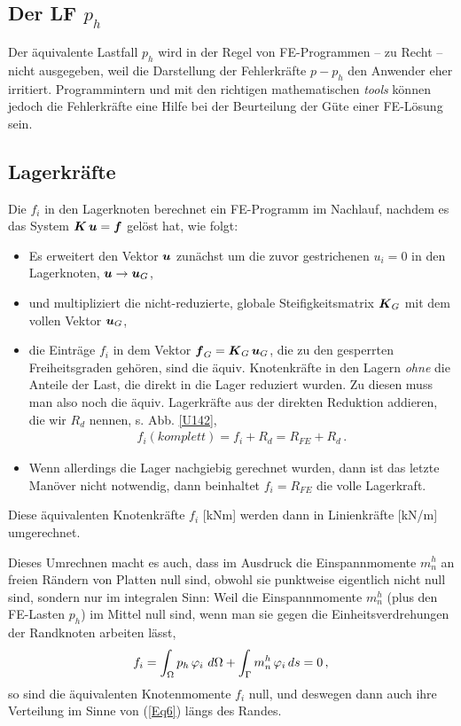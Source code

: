 {\textcolor{sectionTitleBlue}{\subsection{Der LF $p_h$}}}
 Der \"{a}quivalente Lastfall $p_h$ wird in der Regel von FE-Program\-men -- zu Recht -- nicht ausgegeben, weil die Darstellung der Fehlerkr\"{a}fte $p - p_h$ den Anwender eher irritiert. Programmintern und mit den richtigen mathematischen {\em tools\/} k\"{o}nnen jedoch die Fehlerkr\"{a}fte eine Hilfe bei der Beurteilung der G\"{u}te einer FE-L\"{o}sung sein.
\pagebreak
{\textcolor{sectionTitleBlue}{\subsection{Lagerkr\"{a}fte}}}
Die $f_i$ in den Lagerknoten berechnet ein FE-Programm im Nachlauf, nachdem es das System $\mbox{\boldmath $K$}\,\mbox{\boldmath $u$} = \mbox{\boldmath $f$}$ gel\"{o}st hat, wie folgt: \\
\begin{itemize}
  \item Es erweitert den Vektor $\mbox{\boldmath $u$}$ zun\"{a}chst um die zuvor gestrichenen $u_i = 0$ in den Lagerknoten, $\mbox{\boldmath $u$} \to \mbox{\boldmath $u$}_{G}$,
  \item und multipliziert die nicht-reduzierte, globale Steifigkeitsmatrix $\mbox{\boldmath $K$}_{G}$ mit dem vollen Vektor $\mbox{\boldmath $u$}_{G}$,
  \item die Eintr\"{a}ge $f_i$ in dem Vektor $\mbox{\boldmath $f$}_{G} = \mbox{\boldmath $K$}_{G}\,\mbox{\boldmath $u$}_{G}$, die zu den gesperrten Freiheitsgraden geh\"{o}ren, sind die \"{a}quiv. Knotenkr\"{a}fte in den Lagern {\em ohne\/} die Anteile der Last, die direkt in die Lager reduziert wurden. Zu diesen muss man also noch die \"{a}quiv. Lagerkr\"{a}fte aus der direkten Reduktion addieren, die wir $R_{d}$ nennen, s. Abb. \ref{U142},
      \begin{align}
      f_i(komplett) = f_i +  R_{d} = R_{FE} + R_{d}\,.
      \end{align}
      \item Wenn allerdings die Lager nachgiebig gerechnet wurden, dann ist das letzte Man\"{o}ver nicht notwendig, dann beinhaltet $f_i = R_{FE}$ die volle Lagerkraft.
\end{itemize}

Diese \"{a}quivalenten Knotenkr\"{a}fte $f_i$ [kNm] werden dann in Linienkr\"{a}fte [kN/m]
umgerechnet.


Dieses Umrechnen macht es auch, dass im Ausdruck die Einspannmomente $m_n^h$ an freien R\"{a}ndern von Platten null sind, obwohl sie punktweise eigentlich nicht null sind, sondern nur im integralen Sinn: Weil die Einspannmomente $m_n^h$ (plus den FE-Lasten $p_h$) im Mittel null sind, wenn man sie gegen die Einheitsverdrehungen der Randknoten arbeiten l\"{a}sst,
\begin{align}\label{Eq6}
f_i = \int_{\Omega} p_h\,\varphi_i \,\,d\Omega + \int_{\Gamma} m_n^h\,\varphi_i \,ds = 0 \,,
\end{align}
so sind die \"{a}quivalenten Knotenmomente $f_i$ null, und deswegen dann auch ihre Verteilung im Sinne von (\ref{Eq6}) l\"{a}ngs des Randes.


